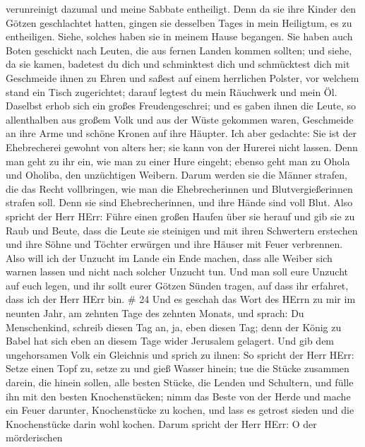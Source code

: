 verunreinigt dazumal und meine Sabbate entheiligt.  Denn da
sie ihre Kinder den Götzen geschlachtet hatten, gingen sie desselben
Tages in mein Heiligtum, es zu entheiligen. Siehe, solches haben sie in
meinem Hause begangen.  Sie haben auch Boten geschickt nach
Leuten, die aus fernen Landen kommen sollten; und siehe, da sie kamen,
badetest du dich und schminktest dich und schmücktest dich mit
Geschmeide ihnen zu Ehren  und saßest auf einem herrlichen
Polster, vor welchem stand ein Tisch zugerichtet; darauf legtest du mein
Räuchwerk und mein Öl.  Daselbst erhob sich ein großes
Freudengeschrei; und es gaben ihnen die Leute, so allenthalben aus
großem Volk und aus der Wüste gekommen waren, Geschmeide an ihre Arme
und schöne Kronen auf ihre Häupter.  Ich aber gedachte: Sie
ist der Ehebrecherei gewohnt von alters her; sie kann von der Hurerei
nicht lassen.  Denn man geht zu ihr ein, wie man zu einer
Hure eingeht; ebenso geht man zu Ohola und Oholiba, den unzüchtigen
Weibern.  Darum werden sie die Männer strafen, die das
Recht vollbringen, wie man die Ehebrecherinnen und Blutvergießerinnen
strafen soll. Denn sie sind Ehebrecherinnen, und ihre Hände sind voll
Blut.  Also spricht der Herr HErr: Führe einen großen
Haufen über sie herauf und gib sie zu Raub und Beute,  dass
die Leute sie steinigen und mit ihren Schwertern erstechen und ihre
Söhne und Töchter erwürgen und ihre Häuser mit Feuer verbrennen.
 Also will ich der Unzucht im Lande ein Ende machen, dass
alle Weiber sich warnen lassen und nicht nach solcher Unzucht tun.
 Und man soll eure Unzucht auf euch legen, und ihr sollt
eurer Götzen Sünden tragen, auf dass ihr erfahret, dass ich der Herr
HErr bin. \# 24  Und es geschah das Wort des HErrn zu mir im
neunten Jahr, am zehnten Tage des zehnten Monats, und sprach:
 Du Menschenkind, schreib diesen Tag an, ja, eben diesen
Tag; denn der König zu Babel hat sich eben an diesem Tage wider
Jerusalem gelagert.  Und gib dem ungehorsamen Volk ein
Gleichnis und sprich zu ihnen: So spricht der Herr HErr: Setze einen
Topf zu, setze zu und gieß Wasser hinein;  tue die Stücke
zusammen darein, die hinein sollen, alle besten Stücke, die Lenden und
Schultern, und fülle ihn mit den besten Knochenstücken; 
nimm das Beste von der Herde und mache ein Feuer darunter, Knochenstücke
zu kochen, und lass es getrost sieden und die Knochenstücke darin wohl
kochen.  Darum spricht der Herr HErr: O der mörderischen

